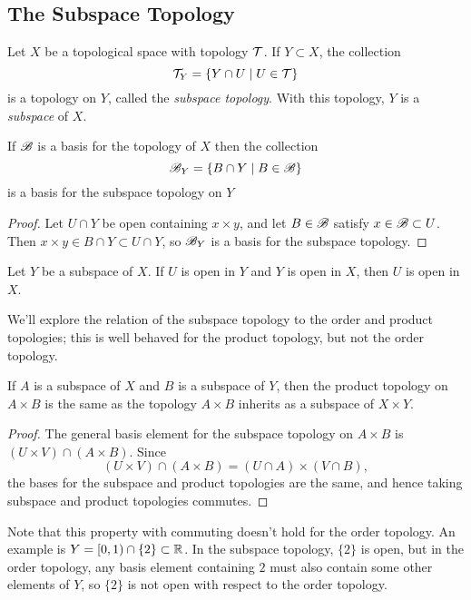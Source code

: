 \documentclass[10pt]{report}
\begin{document}
\subsection{The Subspace Topology}
\begin{definition}
  Let $X$ be a topological space with topology $\mathcal{T}$.
  If $Y  \subset X$, the collection
  \[ \mathcal{T}_Y = \left\{ Y \cap U \mid U \in \mathcal{T} \right\} \]
  is a topology on $Y$, called the \emph{subspace topology}.
  With this topology, $Y$ is a \emph{subspace} of $X$.
\end{definition}

\begin{lemma}
  If $\mathscr{B}$ is a basis for the topology of $X$ then the collection
  \[
    \mathscr{B}_Y = \left\{ B \cap Y \mid B \in \mathscr{B} \right\}
  \]
  is a basis for the subspace topology on $Y$
\end{lemma}
\begin{proof}
  Let $U \cap Y$ be open containing $x \times y$, and let $B \in \mathscr{B}$ satisfy $x \in \mathscr{B} \subset U$.
  Then $x \times y \in B \cap Y \subset U \cap Y$, so $\mathscr{B}_Y$ is a basis for the subspace topology.
\end{proof}

\begin{lemma}
  Let $Y$ be a subspace of $X$. If $U$ is open in $Y$ and $Y$ is open in $X$, then $U$ is open in $X$.
\end{lemma}

We'll explore the relation of the subspace topology to the order and product topologies;
this is well behaved for the product topology, but not the order topology.

\begin{theorem}
  If $A$ is a subspace of $X$ and $B$ is a subspace of $Y$, then the product topology on $A \times B$ is the same as the topology $A \times B$ inherits as a subspace of $X \times Y$.
\end{theorem}
\begin{proof}
  The general basis element for the subspace topology on $A \times B$ is $(U \times V) \cap (A \times B)$.
  Since
  \[
    (U \times V) \cap (A \times B) = (U \cap A) \times (V \cap B),  
  \]
  the bases for the subspace and product topologies are the same, and hence taking subspace and product topologies commutes.
\end{proof}

Note that this property with commuting doesn't hold for the order topology. 
An example is $Y = [0,1) \cap \{2\} \subset \mathbb{R}$. 
In the subspace topology, $\{2\}$ is open, but in the order topology, any basis element containing $2$ must also contain some other elements of $Y$, so $\{2\}$ is not open with respect to the order topology.
\end{document}
